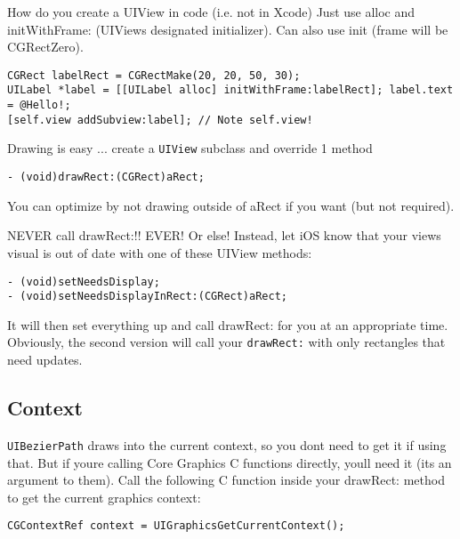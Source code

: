 \documentclass[12pt]{article}
\newcommand{\co}{\texttt}
\begin{document}
How do you create a UIView in code (i.e. not in Xcode)
Just use alloc and initWithFrame: (UIViews designated initializer). Can also use init (frame will be CGRectZero).
\begin{lstlisting}
CGRect labelRect = CGRectMake(20, 20, 50, 30);
UILabel *label = [[UILabel alloc] initWithFrame:labelRect]; label.text = @Hello!;
[self.view addSubview:label]; // Note self.view!
\end{lstlisting}

Drawing is easy ... create a \co{UIView} subclass and override 1 method 
\begin{lstlisting}
- (void)drawRect:(CGRect)aRect;
\end{lstlisting}
You can optimize by not drawing outside of aRect if you want (but not required). 

NEVER call drawRect:!! EVER! Or else!
Instead, let iOS know that your views visual is out of date with one of these UIView methods:
\begin{lstlisting}
- (void)setNeedsDisplay;
- (void)setNeedsDisplayInRect:(CGRect)aRect;
\end{lstlisting}
It will then set everything up and call drawRect: for you at an appropriate time.
Obviously, the second version will call your \co{drawRect:} with only rectangles that need updates.

\subsection{Context}
\co{UIBezierPath} draws into the current context, so you dont need to get it if using that.
But if youre calling Core Graphics C functions directly, youll need it (its an argument to them). Call the following C function inside your drawRect: method to get the current graphics context: 
\begin{lstlisting} 
CGContextRef context = UIGraphicsGetCurrentContext();
\end{lstlisting}
\end{document}
